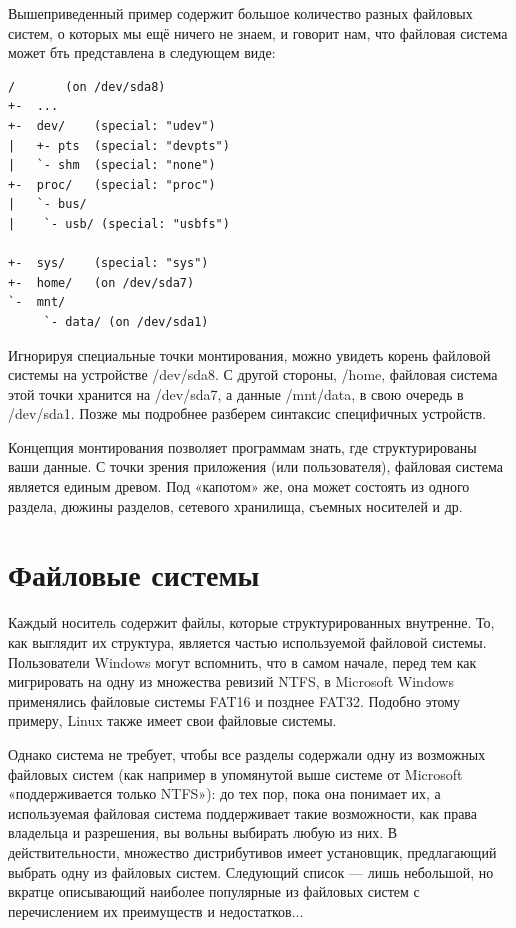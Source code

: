 \documentclass[10pt]{book}
\begin{document}
 
Вышеприведенный пример содержит большое количество разных файловых систем, о которых мы ещё ничего не знаем, и говорит нам, что файловая система может бть представлена в следующем виде:

\vspace{3mm}
\begin{tcolorbox}
\begin{lstlisting}
/       (on /dev/sda8)
+-  ...
+-  dev/    (special: "udev")
|   +- pts  (special: "devpts")
|   `- shm  (special: "none")
+-  proc/   (special: "proc")
|   `- bus/
|    `- usb/ (special: "usbfs")

+-  sys/    (special: "sys")
+-  home/   (on /dev/sda7)
`-  mnt/
     `- data/ (on /dev/sda1)
\end{lstlisting}
\end{tcolorbox}

Игнорируя специальные точки монтирования, можно увидеть корень файловой системы на устройстве /dev/sda8. С другой стороны, /home, файловая система этой точки хранится на /dev/sda7, а данные /mnt/data, в свою очередь в /dev/sda1. Позже мы подробнее разберем синтаксис специфичных устройств.

Концепция монтирования позволяет программам знать, где структурированы ваши данные. С точки зрения приложения (или пользователя), файловая система является единым древом. Под «капотом» же, она может состоять из одного раздела, дюжины разделов, сетевого хранилища, съемных носителей и др.

\section{Файловые системы}

Каждый носитель содержит файлы, которые структурированных внутренне. То, как выглядит их структура, является частью используемой файловой системы. Пользователи Windows могут вспомнить, что в самом начале, перед тем как мигрировать на одну из множества ревизий NTFS, в Microsoft Windows применялись файловые системы FAT16 и позднее FAT32. Подобно этому примеру, Linux также имеет свои файловые системы.

Однако система не требует, чтобы все разделы содержали одну из возможных файловых систем (как например в упомянутой выше системе от Microsoft «поддерживается только NTFS»): до тех пор, пока она понимает их, а используемая файловая система поддерживает такие возможности, как права владельца и разрешения, вы вольны выбирать любую из них. В действительности, множество дистрибутивов имеет установщик, предлагающий выбрать одну из файловых систем. Следующий список — лишь небольшой, но вкратце описывающий наиболее популярные из файловых систем с перечислением их преимуществ и недостатков...
\end{document}
